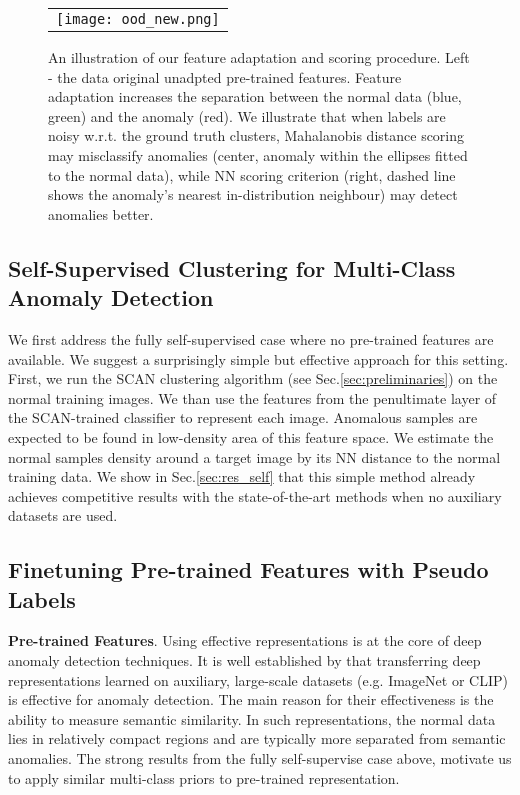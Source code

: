 \documentclass[runningheads]{llncs}
\begin{document}
\begin{figure}[t]
\centering
  \centering
    \begin{tabular}{c}
    \texttt{[image: ood\_new.png]}
    \end{tabular}
    \caption{An illustration of our feature adaptation and scoring procedure. Left - the data original unadpted pre-trained features. Feature adaptation increases the separation between the normal data (blue, green) and the anomaly (red). We illustrate that when labels are noisy w.r.t. the ground truth clusters, Mahalanobis distance scoring may misclassify anomalies (center, anomaly within the ellipses fitted to the normal data), while
    NN scoring criterion (right, dashed line shows the anomaly's nearest in-distribution neighbour) may detect anomalies better.} 
    \label{fig:ood_clustering}

\end{figure}


\subsection{Self-Supervised Clustering for Multi-Class Anomaly Detection}
\label{sec:method_self}


We first address the fully self-supervised case where no pre-trained features are available. We suggest a surprisingly simple but effective approach for this setting. First, we run the SCAN clustering algorithm (see Sec.\ref{sec:preliminaries}) on the normal training images. We than use  the features from the penultimate layer of the SCAN-trained classifier to represent each image. Anomalous samples are expected to be found in low-density area of this feature space. We estimate the normal samples density around a target image by its NN distance to the normal training data.  We show in Sec.\ref{sec:res_self} that this simple method already achieves competitive results with the state-of-the-art methods when no auxiliary datasets are used. 

\subsection{Finetuning Pre-trained Features with Pseudo Labels}
\label{sec:method_pretrain}

\textbf{Pre-trained Features}. Using effective representations is at the core of deep anomaly detection techniques. It is well established by \cite{reiss2021panda,fort2021exploring}  that transferring deep representations learned on auxiliary, large-scale datasets (e.g. ImageNet or CLIP) is effective for anomaly detection. The main reason for their effectiveness is the ability to measure semantic similarity. In such representations, the normal data lies in relatively compact regions and are typically more separated from semantic anomalies.    The strong results from the fully self-supervise case above, motivate us to apply similar multi-class priors to pre-trained representation.
\end{document}
